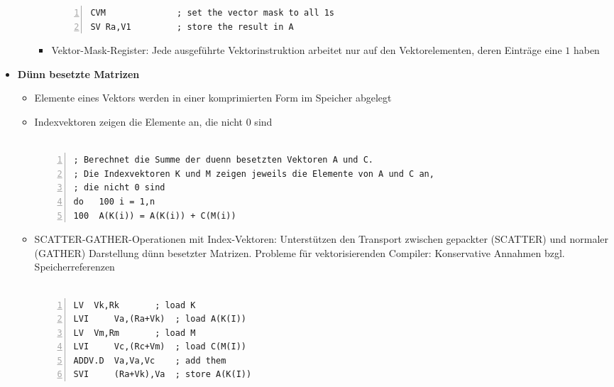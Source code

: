 \begin{itemize}
\begin{itemize}
\begin{itemize}
\begin{minipage}{\linewidth}
\begin{lstlisting}[frame=single,numbers=left,mathescape,language={[mips]Assembler}]
CVM              ; set the vector mask to all 1s
SV Ra,V1         ; store the result in A
				\end{lstlisting}
				\end{minipage}
			\item Vektor-Mask-Register: Jede ausgeführte Vektorinstruktion arbeitet nur auf den Vektorelementen, deren Einträge eine \(1\) haben
		\end{itemize}
	\end{itemize}
	\item \textbf{Dünn besetzte Matrizen}
	\begin{itemize}
		\item Elemente eines Vektors werden in einer komprimierten Form im Speicher abgelegt
		\item Indexvektoren zeigen die Elemente an, die nicht \(0\) sind\\\\
			\begin{minipage}{\linewidth}
			\begin{lstlisting}[frame=single,numbers=left,mathescape,language={[mips]Assembler}]
; Berechnet die Summe der duenn besetzten Vektoren A und C.
; Die Indexvektoren K und M zeigen jeweils die Elemente von A und C an,
; die nicht 0 sind
do 	 100 i = 1,n
100  A(K(i)) = A(K(i)) + C(M(i))
			\end{lstlisting}
			\end{minipage}
		\item SCATTER-GATHER-Operationen mit Index-Vektoren: Unterstützen den Transport zwischen gepackter (SCATTER) und normaler (GATHER) Darstellung dünn besetzter Matrizen. Probleme für vektorisierenden Compiler: Konservative Annahmen bzgl. Speicherreferenzen\\\\
			\begin{minipage}{\linewidth}
			\begin{lstlisting}[frame=single,numbers=left,mathescape,language={[mips]Assembler}]
LV 	Vk,Rk 		; load K
LVI 	Va,(Ra+Vk) 	; load A(K(I))
LV 	Vm,Rm 		; load M
LVI 	Vc,(Rc+Vm) 	; load C(M(I))
ADDV.D 	Va,Va,Vc 	; add them
SVI 	(Ra+Vk),Va 	; store A(K(I))
			\end{lstlisting}
			\end{minipage}		
	\end{itemize}
\end{itemize}

